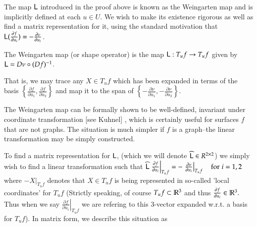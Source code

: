 	
	The map $\mathsf{L}$ introduced in the proof above is known as the Weingarten map
	and is implicitly defined at each $u \in U$. 
	We wish to make its existence rigorous as well as find a matrix representation for it, using the standard motivation that $\mathsf{L}(\frac{\partial f}{\partial u_i}) = - \frac{\partial \nu}{\partial u_i}$.
	

	\begin{defn}
	The Weingarten map (or shape operator) is the map $\mathsf{L}: T_u f \to T_u f$ given by
	$\mathsf{L} = D\nu \circ (Df)^{-1}$.
	\end{defn}
	
	
	That is, we may trace any $X \in T_u f$ which has been expanded in terms of the basis 
	$\left\{\frac{\partial f}{\partial u_1} , \frac{\partial f}{\partial u_2}\right\}$
	and map it to the span of $\left\{-\frac{\partial \nu}{\partial u_1} , -\frac{\partial \nu}{\partial u_2}\right\}$. 
	
	The Weingarten map can be formally shown to be well-defined, invariant under coordinate transformation [see Kuhnel] , which is certainly useful for surfaces $f$ that are not graphs. The situation is much simpler if $f$ is a graph--the linear transformation may be simply constructed.		
	
	To find a matrix representation for $\mathsf{L}$, (which we will denote $\widehat{\mathsf{L}} \in R^{2\times2}$) we simply wish to find a linear transformation
	such that
	$\widehat{\mathsf{L}} \left.\frac{\partial f}{\partial u_i}\right|_{T_u f}
		= - \left.\frac{\partial \nu}{\partial u_i}\right|_{T_u f} \quad \textrm{for} \; i=1,2$
			where $- \left.X\right|_{T_u f}$ denotes that $X \in T_u f$ is being represented in so-called
	'local coordinates' for $T_u f$ (Strictly speaking, of course $T_u f \subset \mathbb{R}^3$ and thus
	$\frac{\partial f}{\partial u_i} \in \mathbb{R}^3.$ Thus when we say $ \left.\frac{\partial f}{\partial u_i}\right|_{T_u f}$ we are refering to this 3-vector expanded w.r.t. a basis for $T_u f$). In matrix form, we describe this situation as
	
